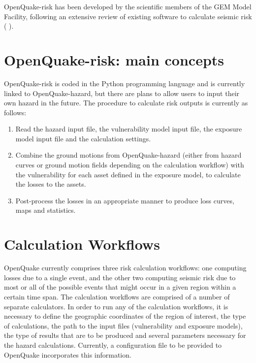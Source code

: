 OpenQuake-risk has been developed by the scientific members of the GEM Model Facility, following an extensive review of existing software to calculate seismic risk (\citep{CrowleyH.2010} ). 
%
\section{OpenQuake-risk: main concepts}
OpenQuake-risk is coded in the Python programming language and is currently linked to OpenQuake-hazard, but there are plans to allow users to input their own hazard in the future. The procedure to calculate risk outputs is currently as follows:
\begin{enumerate}

\item Read the hazard input file, the vulnerability model input file, the exposure model input file and the calculation settings.

\item Combine the ground motions from OpenQuake-hazard (either from hazard curves or ground motion fields depending on the calculation workflow) with the vulnerability for each asset defined in the exposure model, to calculate the losses to the assets.

\item Post-process the losses in an appropriate manner to produce loss curves, maps and statistics. 

\end{enumerate}
%
\section{Calculation Workflows}
OpenQuake currently comprises three risk calculation workflows: one computing losses due to a single event, and the other two computing seismic risk due to most or all of the possible events that might occur in a given region within a certain time span. The calculation workflows are comprised of a number of separate calculators. In order to run any of the calculation workflows, it is necessary to define the geographic coordinates of the region of interest, the type of calculations, the path to the input files (vulnerability and exposure models), the type of results that are to be produced and several parameters necessary for the hazard calculations. Currently, a configuration file to be provided to OpenQuake incorporates this information.

